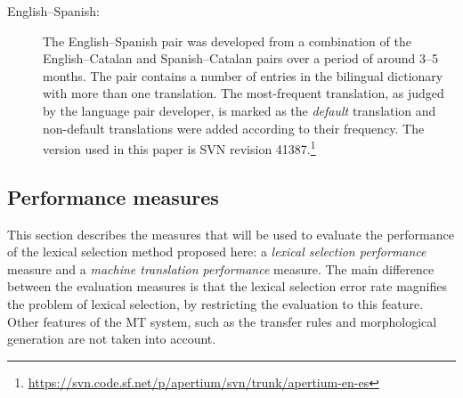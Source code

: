\documentclass[11pt]{article}
\newcommand{\comment}[1]{\todo{#1}}
\begin{document}
\begin{description}
\item[English--Spanish:] The English--Spanish pair was developed from
  a combination of the English--Catalan and Spanish--Catalan pairs
  over a period of around 3--5 months. The pair 
  contains a number of entries in the bilingual dictionary with
  more than one translation. The most-frequent translation, as judged
  by the language pair developer, is marked as the \emph{default}
  translation and non-default translations were added according to
  their frequency. The version used in this paper is SVN revision
  41387.\footnote{\url{https://svn.code.sf.net/p/apertium/svn/trunk/apertium-en-es}}
\end{description}


\subsection{Performance measures}
\label{ss:measures}

This section describes the measures that will be used to evaluate the
performance of the lexical selection method proposed here: a
\emph{lexical selection performance} measure and a \emph{machine
  translation performance} measure. The main difference between the
evaluation measures is that the lexical selection error rate magnifies
the problem of lexical selection, by restricting the evaluation to
this feature. Other features of the MT system, such as the transfer rules
and morphological generation are not taken into account.

\label{sec:eval-metrics}
\end{document}
